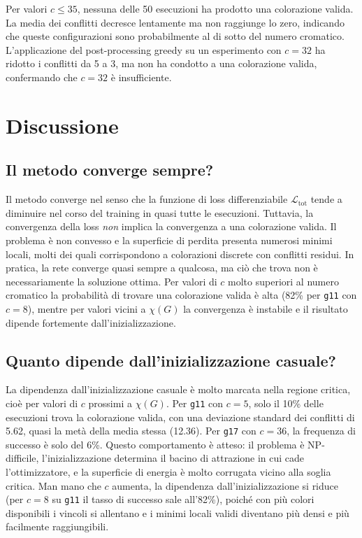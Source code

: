 \documentclass[11pt, a4paper]{article}
\begin{document}
Per valori $c \leq 35$, nessuna delle 50 esecuzioni ha prodotto una colorazione valida.
La media dei conflitti decresce lentamente ma non raggiunge lo zero, indicando che queste
configurazioni sono probabilmente al di sotto del numero cromatico. L'applicazione del
post-processing greedy su un esperimento con $c = 32$ ha ridotto i conflitti da 5 a 3,
ma non ha condotto a una colorazione valida, confermando che $c = 32$ è insufficiente.

\section{Discussione}

\subsection*{Il metodo converge sempre?}

Il metodo converge nel senso che la funzione di loss differenziabile
$\mathcal{L}_{\mathrm{tot}}$ tende a diminuire nel corso del training in quasi tutte le
esecuzioni. Tuttavia, la convergenza della loss \emph{non} implica la convergenza a una
colorazione valida. Il problema è non convesso e la superficie di perdita presenta numerosi
minimi locali, molti dei quali corrispondono a colorazioni discrete con conflitti residui.
In pratica, la rete converge quasi sempre a qualcosa, ma ciò che trova non è necessariamente
la soluzione ottima. Per valori di $c$ molto superiori al numero cromatico la probabilità
di trovare una colorazione valida è alta (82\% per \texttt{g11} con $c = 8$), mentre per
valori vicini a $\chi(G)$ la convergenza è instabile e il risultato dipende fortemente
dall'inizializzazione.

\subsection*{Quanto dipende dall'inizializzazione casuale?}

La dipendenza dall'inizializzazione casuale è molto marcata nella regione critica, cioè
per valori di $c$ prossimi a $\chi(G)$. Per \texttt{g11} con $c = 5$, solo il 10\% delle
esecuzioni trova la colorazione valida, con una deviazione standard dei conflitti di 5.62,
quasi la metà della media stessa (12.36). Per \texttt{g17} con $c = 36$, la frequenza di
successo è solo del 6\%. Questo comportamento è atteso: il problema è NP-difficile,
l'inizializzazione determina il bacino di attrazione in cui cade l'ottimizzatore, e la
superficie di energia è molto corrugata vicino alla soglia critica. Man mano che $c$
aumenta, la dipendenza dall'inizializzazione si riduce (per $c = 8$ su \texttt{g11} il
tasso di successo sale all'82\%), poiché con più colori disponibili i vincoli si allentano
e i minimi locali validi diventano più densi e più facilmente raggiungibili.
\end{document}
